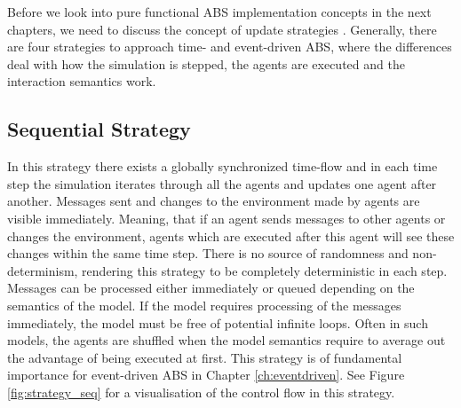 Before we look into pure functional ABS implementation concepts in the next chapters, we need to discuss the concept of update strategies \cite{thaler_art_2017}. Generally, there are four strategies to approach time- and event-driven ABS, where the differences deal with how the simulation is stepped, the agents are executed and the interaction semantics work.


\subsection{Sequential Strategy}
\label{sec:seq_strategy}
In this strategy there exists a globally synchronized time-flow and in each time step the simulation iterates through all the agents and updates one agent after another. Messages sent and changes to the environment made by agents are visible immediately. Meaning, that if an agent sends messages to other agents or changes the environment, agents which are executed after this agent will see these changes within the same time step. There is no source of randomness and non-determinism, rendering this strategy to be completely deterministic in each step. Messages can be processed either immediately or queued depending on the semantics of the model. If the model requires processing of the messages immediately, the model must be free of potential infinite loops. Often in such models, the agents are shuffled when the model semantics require to average out the advantage of being executed at first. This strategy is of fundamental importance for event-driven ABS in Chapter \ref{ch:eventdriven}. See Figure \ref{fig:strategy_seq} for a visualisation of the control flow in this strategy.

